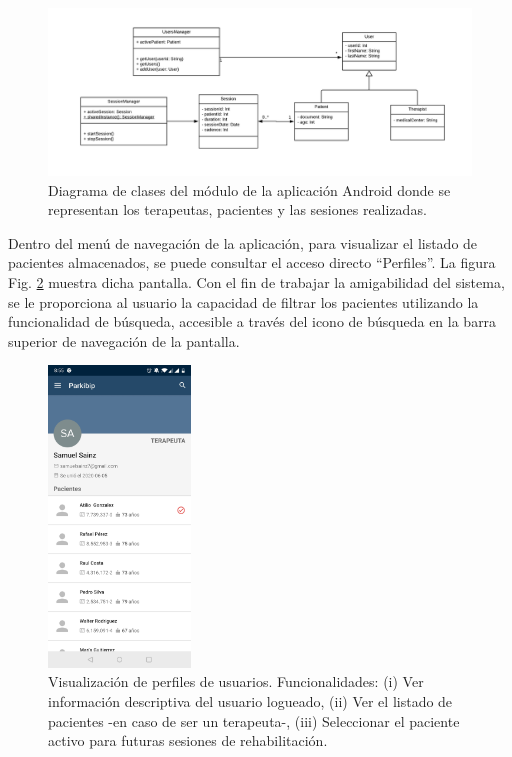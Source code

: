 \begin{figure}[H]
    \hspace*{-2.0cm}%
    \includegraphics[clip,width=1.25 \columnwidth]{TESIS/imagenes/chap05/users-and-sessions-class-diagram.png}
    \caption{Diagrama de clases del módulo de la aplicación Android donde se representan los terapeutas, pacientes y las sesiones realizadas.}
    \label{FIG:users-and-sessions-class-diagram}
\end{figure} 

Dentro del menú de navegación de la aplicación, para visualizar el listado de pacientes almacenados, se puede consultar el acceso directo ``Perfiles''. La figura Fig. \ref{fig:activity-users}  muestra dicha pantalla. Con el fin de trabajar la amigabilidad del sistema, se le proporciona al usuario la capacidad de filtrar los pacientes utilizando la funcionalidad de búsqueda, accesible a través del icono de búsqueda en la barra superior de navegación de la pantalla. 

\newpage

\begin{figure}[H]
 \centering
 \includegraphics[height=8cm]{TESIS/imagenes/chap05/activity-users.JPG}
 \caption{Visualización de perfiles de usuarios. Funcionalidades: (i) Ver información descriptiva del usuario logueado, (ii) Ver el listado de pacientes -en caso de ser un terapeuta-, (iii) Seleccionar el paciente activo para futuras sesiones de rehabilitación.}
 \label{fig:activity-users}
\end{figure}

